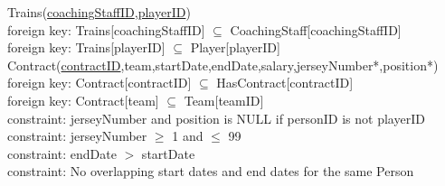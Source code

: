 {\color{ForestGreen}Trains(\underline{coachingStaffID},\underline{playerID})}\\
{\color{Orange}\hspace{2mm} foreign key: {\color{Magenta}Trains[coachingStaffID] $\subseteq$ CoachingStaff[coachingStaffID]}} \\
{\color{Orange}\hspace{2mm} foreign key: {\color{Magenta}Trains[playerID] $\subseteq$ Player[playerID]}} \\


{\color{ForestGreen}Contract(\underline{contractID},team,startDate,endDate,salary,jerseyNumber*,position*)}\\
{\color{Orange}\hspace{2mm} foreign key: {\color{Magenta}Contract[contractID] $\subseteq$ HasContract[contractID]}} \\
{\color{Orange}\hspace{2mm} foreign key: {\color{Magenta}Contract[team] $\subseteq$ Team[teamID]}} \\
{\color{Orange}\hspace{2mm} constraint: {\color{Magenta}jerseyNumber and position is NULL if personID is not playerID}} \\
{\color{Orange}\hspace{2mm} constraint: {\color{Magenta}jerseyNumber $\geqslant$  1 and $\leqslant$ 99}} \\
{\color{Orange}\hspace{2mm} constraint: {\color{Magenta}endDate $>$ startDate}} \\
{\color{Orange}\hspace{2mm} constraint: {\color{Magenta}No overlapping start dates and end dates for the same Person}} \\


